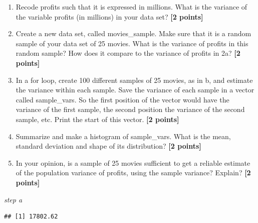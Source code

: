 \documentclass[
]{article}
\newenvironment{Shaded}{\begin{snugshade}}{\end{snugshade}}
\newcommand{\DecValTok}[1]{\textcolor[rgb]{0.00,0.00,0.81}{#1}}
\newcommand{\FunctionTok}[1]{\textcolor[rgb]{0.13,0.29,0.53}{\textbf{#1}}}
\newcommand{\NormalTok}[1]{#1}
\newcommand{\OtherTok}[1]{\textcolor[rgb]{0.56,0.35,0.01}{#1}}
\newcommand{\SpecialCharTok}[1]{\textcolor[rgb]{0.81,0.36,0.00}{\textbf{#1}}}
\providecommand{\tightlist}{%
  \setlength{\itemsep}{0pt}\setlength{\parskip}{0pt}}
\begin{document}
\begin{enumerate}
\def\labelenumi{\alph{enumi}.}
\tightlist
\item
  Recode profits such that it is expressed in millions. What is the
  variance of the variable profits (in millions) in your data set?
  \textbf{[2 points]}
\item
  Create a new data set, called movies\_sample. Make sure that it is a
  random sample of your data set of 25 movies. What is the variance of
  profits in this random sample? How does it compare to the variance of
  profits in 2a? \textbf{[2 points]}
\item
  In a for loop, create 100 different samples of 25 movies, as in b, and
  estimate the variance within each sample. Save the variance of each
  sample in a vector called sample\_vars. So the first position of the
  vector would have the variance of the first sample, the second
  position the variance of the second sample, etc. Print the start of
  this vector. \textbf{[2 points]}
\item
  Summarize and make a histogram of sample\_vars. What is the mean,
  standard deviation and shape of its distribution? \textbf{[2 points]}
\item
  In your opinion, is a sample of 25 movies sufficient to get a reliable
  estimate of the population variance of profits, using the sample
  variance? Explain? \textbf{[2 points]}
\end{enumerate}

\emph{step a}

\begin{Shaded}
\end{Shaded}

\begin{verbatim}
## [1] 17802.62
\end{verbatim}
\end{document}
